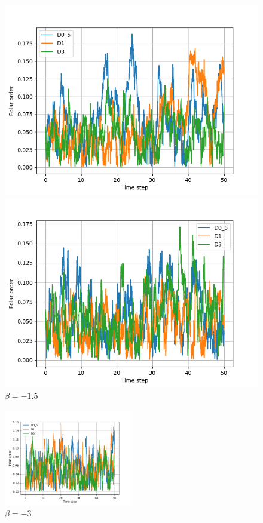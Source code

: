 \documentclass{article}
\begin{document}
\begin{figure}[H]
    \begin{minipage}{0.49\textwidth}
        \includegraphics[width=1\textwidth]{videos/simulations/sim_D/beta3/dens_0_26/combined_polars.png}
        \caption{\footnotesize $\beta = 3$}
    \end{minipage}\hfill
    \begin{minipage}{0.49\textwidth}
        \includegraphics[width=1\textwidth]{videos/simulations/sim_D/betam1_5/dens_0_26/combined_polars.png}
        \caption{\footnotesize $\beta = -1.5$}
    \end{minipage}
\end{figure}
\begin{figure}[H]
    \centering
    \includegraphics[width=0.5\textwidth]{videos/simulations/sim_D/betam3/dens_0_26/combined_polars.png}
    \caption{\footnotesize $\beta = -3$}
\end{figure}
\end{document}
